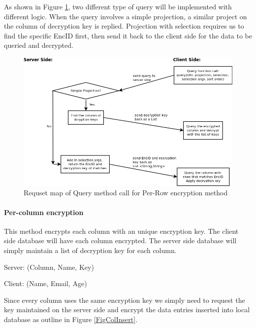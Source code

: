 As shown in Figure \ref{FigRowQuery}, two different type of query will be implemented with different logic. When the query involves a simple projection, a similar project on the column of decryption key is replied. Projection with selection requires us to find the specific EncID first, then send it back to the client side for the data to be queried and decrypted.

\begin{figure}[h]
  \centering
  \includegraphics[scale=0.45]{./Figs/row_query.png}
  \caption
  {Requset map of Query method call for Per-Row encryption method}
  \label{FigRowQuery}
\end{figure}

\paragraph{Per-column encryption}\label{LitRevEncCol}

This method encrypts each column with an unique encryption key. The client side database will have each column encrypted. The server side database will simply maintain a list of decryption key for each column.

Server: (Column, Name, Key)

Client: (Name, Email, Age)

Since every column uses the same encryption key we simply need to request the key maintained on the server side and encrypt the data entries inserted into local database as outline in Figure \ref{FigColInsert}.

